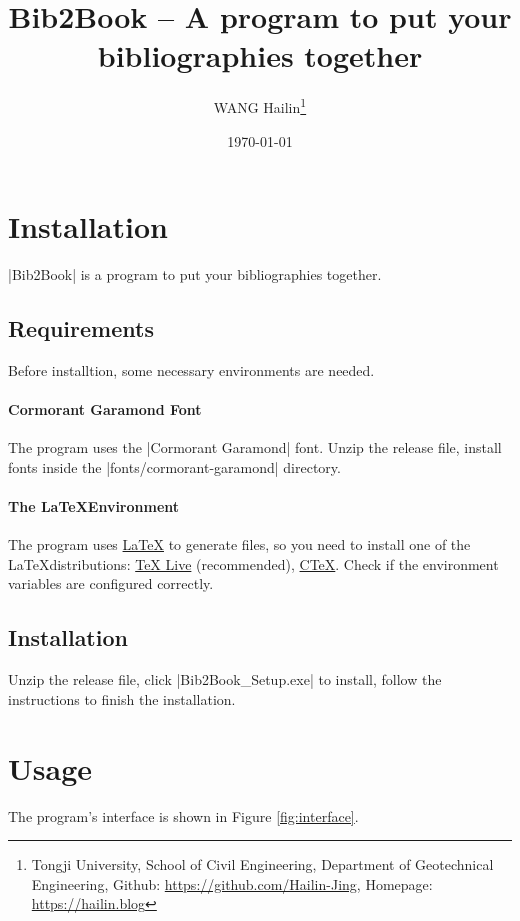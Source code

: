 \documentclass{article}
\title{Bib2Book -- A program to put your bibliographies together}
\author{WANG Hailin\thanks{Tongji University, School of Civil Engineering, Department of Geotechnical Engineering, Github: \url{https://github.com/Hailin-Jing}, Homepage: \url{https://hailin.blog}}}
\date{\today}
\begin{document}
    \maketitle

    \section{Installation}

    |Bib2Book| is a program to put your bibliographies together. 

    \subsection{Requirements}

    Before installtion, some necessary environments are needed.

    \paragraph{Cormorant Garamond Font}

    The program uses the |Cormorant Garamond| font. Unzip the release file, install fonts inside the |fonts/cormorant-garamond| directory.

    \paragraph{The \LaTeX Environment}

    The program uses \href{https://www.latex-project.org}{\LaTeX} to generate files, so you need to install one of the \LaTeX distributions: \href{http://www.tug.org/texlive}{TeX Live} (recommended), \href{http://www.ctex.org/HomePage}{C\TeX}. Check if the environment variables are configured correctly.

    \subsection{Installation}

    Unzip the release file, click |Bib2Book_Setup.exe| to install, follow the instructions to finish the installation.

    \clearpage

    \section{Usage}

    The program's interface is shown in Figure \ref{fig:interface}.
\end{document}
